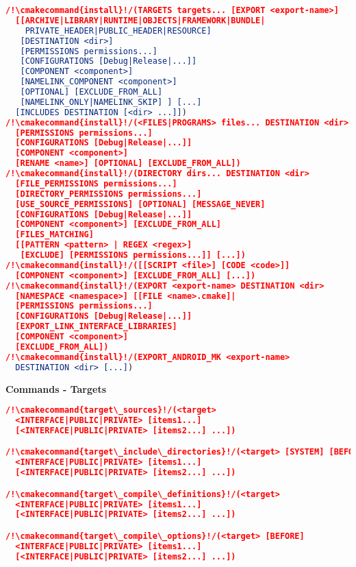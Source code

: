 \documentclass{article}
\newcommand{\cmakecommand}[1]{{\href{https://cmake.org/cmake/help/v3.13/command/#1.html}{#1}}}
\begin{document}
\begin{minipage}[t]{0.18\linewidth}
\begin{lstlisting}[language=CMake]
/!\cmakecommand{install}!/(TARGETS targets... [EXPORT <export-name>]
  [[ARCHIVE|LIBRARY|RUNTIME|OBJECTS|FRAMEWORK|BUNDLE|
    PRIVATE_HEADER|PUBLIC_HEADER|RESOURCE]
   [DESTINATION <dir>]
   [PERMISSIONS permissions...]
   [CONFIGURATIONS [Debug|Release|...]]
   [COMPONENT <component>]
   [NAMELINK_COMPONENT <component>]
   [OPTIONAL] [EXCLUDE_FROM_ALL]
   [NAMELINK_ONLY|NAMELINK_SKIP] ] [...]
  [INCLUDES DESTINATION [<dir> ...]])
/!\cmakecommand{install}!/(<FILES|PROGRAMS> files... DESTINATION <dir>
  [PERMISSIONS permissions...]
  [CONFIGURATIONS [Debug|Release|...]]
  [COMPONENT <component>]
  [RENAME <name>] [OPTIONAL] [EXCLUDE_FROM_ALL])
/!\cmakecommand{install}!/(DIRECTORY dirs... DESTINATION <dir>
  [FILE_PERMISSIONS permissions...]
  [DIRECTORY_PERMISSIONS permissions...]
  [USE_SOURCE_PERMISSIONS] [OPTIONAL] [MESSAGE_NEVER]
  [CONFIGURATIONS [Debug|Release|...]]
  [COMPONENT <component>] [EXCLUDE_FROM_ALL]
  [FILES_MATCHING]
  [[PATTERN <pattern> | REGEX <regex>]
   [EXCLUDE] [PERMISSIONS permissions...]] [...])
/!\cmakecommand{install}!/([[SCRIPT <file>] [CODE <code>]]
  [COMPONENT <component>] [EXCLUDE_FROM_ALL] [...])
/!\cmakecommand{install}!/(EXPORT <export-name> DESTINATION <dir>
  [NAMESPACE <namespace>] [[FILE <name>.cmake]|
  [PERMISSIONS permissions...]
  [CONFIGURATIONS [Debug|Release|...]]
  [EXPORT_LINK_INTERFACE_LIBRARIES]
  [COMPONENT <component>]
  [EXCLUDE_FROM_ALL])
/!\cmakecommand{install}!/(EXPORT_ANDROID_MK <export-name>
  DESTINATION <dir> [...])
\end{lstlisting}

\textbf{Commands - Targets}
\begin{lstlisting}[language=CMake]
/!\cmakecommand{target\_sources}!/(<target>
  <INTERFACE|PUBLIC|PRIVATE> [items1...]
  [<INTERFACE|PUBLIC|PRIVATE> [items2...] ...])

/!\cmakecommand{target\_include\_directories}!/(<target> [SYSTEM] [BEFORE]
  <INTERFACE|PUBLIC|PRIVATE> [items1...]
  [<INTERFACE|PUBLIC|PRIVATE> [items2...] ...])

/!\cmakecommand{target\_compile\_definitions}!/(<target>
  <INTERFACE|PUBLIC|PRIVATE> [items1...]
  [<INTERFACE|PUBLIC|PRIVATE> [items2...] ...])

/!\cmakecommand{target\_compile\_options}!/(<target> [BEFORE]
  <INTERFACE|PUBLIC|PRIVATE> [items1...]
  [<INTERFACE|PUBLIC|PRIVATE> [items2...] ...])


\end{lstlisting}
\end{minipage}
\end{document}
